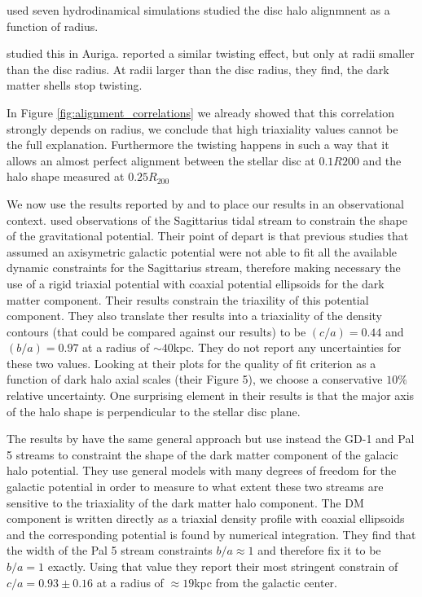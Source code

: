 \documentclass[usenatbib]{mnras}
\begin{document}
\cite{Bailin05} used seven hydrodinamical simulations studied the disc
halo alignmnent as a function of radius.

\cite{Gomez17} studied this in Auriga.
\cite{Debattista13} reported a similar twisting effect, but only at radii smaller
than the disc radius. 
At radii larger than the disc radius, they find, the dark matter
shells stop twisting. 

In Figure \ref{fig:alignment_correlations} we already showed that this
correlation strongly depends on radius, we conclude that high
triaxiality values cannot be the full explanation.
Furthermore the twisting happens in such a way that it allows an
almost perfect alignment between the stellar disc at $0.1R{200}$ and
the halo shape measured at $0.25R_{200}$ 

We now use the results reported by \cite{LM10} and \cite{Bovy16}
to place our results in an observational context.
\cite{LM10} used observations of the Sagittarius tidal stream to
constrain the shape of the gravitational potential.
Their point of depart is that previous studies that assumed an
axisymetric galactic potential were not able to fit all the available
dynamic constraints for the Sagittarius stream, therefore making
necessary the use of a rigid triaxial potential with coaxial potential
ellipsoids for the dark matter component.  
Their results constrain the triaxility of this potential
component. 
They also translate ther results into a triaxiality of the density
contours (that could be compared against our results)
 to be $(c/a)=0.44$ and $(b/a)=0.97$ at a radius of $\sim 40$kpc. 
They do not report any uncertainties for these two values. 
Looking at their plots for the quality of fit criterion as a function
of dark halo axial scales (their Figure 5), we choose a conservative $10\%$
relative uncertainty.
One surprising element in their results is that  the major axis of the
halo shape is perpendicular to the stellar disc plane.  

The results by \cite{Bovy16} have the same general approach but use
instead the GD-1 \citep{2006ApJ...641L..37G} and Pal 5 \citep{2009AJ....137.3378O}
streams to constraint the shape of the dark matter component of the
galacic halo potential.
They use general models with many degrees of freedom for the galactic
potential in order to measure to what extent these two streams are sensitive
to the triaxiality of the dark matter halo component.
The DM component is written directly as a triaxial density profile
with coaxial ellipsoids and the corresponding potential is found by
numerical integration.
They find that the width of the Pal 5 stream constraints $b/a\approx
1$ and therefore fix it to be $b/a=1$ exactly.
Using that value they report their most stringent constrain of
$c/a=0.93\pm0.16$ at a radius of $\approx 19$kpc from the galactic
center. 
\end{document}
